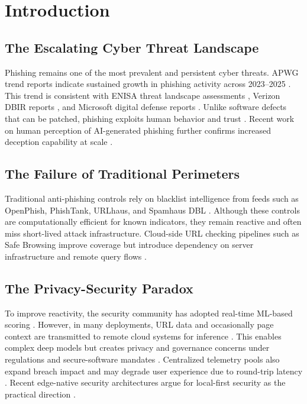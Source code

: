 \documentclass[conference]{IEEEtran}
\begin{document}
\section{Introduction}
\subsection{The Escalating Cyber Threat Landscape}
Phishing remains one of the most prevalent and persistent cyber threats. APWG trend reports indicate sustained growth in phishing activity across 2023--2025 \cite{b37,b42,b52}. This trend is consistent with ENISA threat landscape assessments \cite{b20,b33}, Verizon DBIR reports \cite{b21,b29,b34,b43,b51}, and Microsoft digital defense reports \cite{b35,b44}. Unlike software defects that can be patched, phishing exploits human behavior and trust \cite{b6}. Recent work on human perception of AI-generated phishing further confirms increased deception capability at scale \cite{b54}.

\subsection{The Failure of Traditional Perimeters}
Traditional anti-phishing controls rely on blacklist intelligence from feeds such as OpenPhish, PhishTank, URLhaus, and Spamhaus DBL \cite{b46,b47,b48,b49}. Although these controls are computationally efficient for known indicators, they remain reactive and often miss short-lived attack infrastructure. Cloud-side URL checking pipelines such as Safe Browsing improve coverage but introduce dependency on server infrastructure and remote query flows \cite{b38}.

\subsection{The Privacy-Security Paradox}
To improve reactivity, the security community has adopted real-time ML-based scoring \cite{b11,b12,b17}. However, in many deployments, URL data and occasionally page context are transmitted to remote cloud systems for inference \cite{b38}. This enables complex deep models but creates privacy and governance concerns under regulations and secure-software mandates \cite{b7,b25,b26,b28,b45}. Centralized telemetry pools also expand breach impact and may degrade user experience due to round-trip latency \cite{b41,b43}. Recent edge-native security architectures argue for local-first security as the practical direction \cite{b53}.
\end{document}

